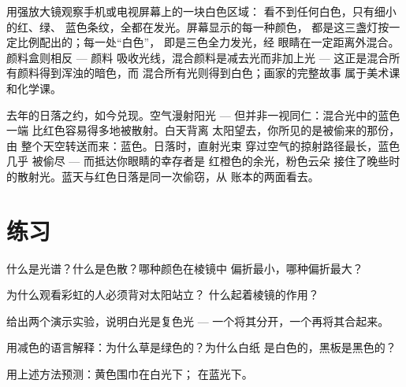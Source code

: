 \begin{example}[口袋里的屏幕]\label{ex:g8:colors-spectra:screen}
用强放大镜观察手机或电视屏幕上的一块白色区域：
看不到任何白色，只有细小的红、绿、
蓝色条纹，全都在发光。屏幕显示的每一种颜色，
都是这三盏灯按一定比例配出的；每一处“白色”，
即是三色全力发光，经
眼睛在一定距离外混合。颜料盒则相反 --- 颜料
吸收光线，混合颜料是减去光而非加上光
--- 这正是混合所有颜料得到浑浊的暗色，而
混合所有光则得到白色；画家的完整故事
属于美术课和化学课。
\end{example}

\begin{remark}[日落，全数兑现]\label{rem:g8:colors-spectra:sunset}
去年的日落之约，如今兑现。空气漫射阳光
--- 但并非一视同仁：混合光中的蓝色一端
比红色容易得多地被散射。白天背离
太阳望去，你所见的是被偷来的那份，由
整个天空转送而来：蓝色。日落时，直射光束
穿过空气的掠射路径最长，蓝色几乎
被偷尽 --- 而抵达你眼睛的幸存者是
红橙色的余光，粉色云朵
接住了晚些时的散射光。蓝天与红色日落是同一次偷窃，从
账本的两面看去。
\end{remark}

\section{练习}

\begin{exercise}[$\star$]\label{exo:g8:colors-spectra:1}
什么是光谱？什么是色散？哪种颜色在棱镜中
偏折最小，哪种偏折最大？
\end{exercise}

\begin{exercise}[$\star$]\label{exo:g8:colors-spectra:2}
为什么观看彩虹的人必须背对太阳站立？
什么起着棱镜的作用？
\end{exercise}

\begin{exercise}[$\star$]\label{exo:g8:colors-spectra:3}
给出两个演示实验，说明白光是复色光 ---
一个将其分开，一个再将其合起来。
\end{exercise}

\begin{exercise}[$\star$]\label{exo:g8:colors-spectra:4}
用减色的语言解释：为什么草是绿色的？为什么白纸
是白色的，黑板是黑色的？
\end{exercise}

\begin{exercise}[$\star$]\label{exo:g8:colors-spectra:5}
用上述方法预测：黄色围巾在白光下；
在蓝光下。
\end{exercise}

